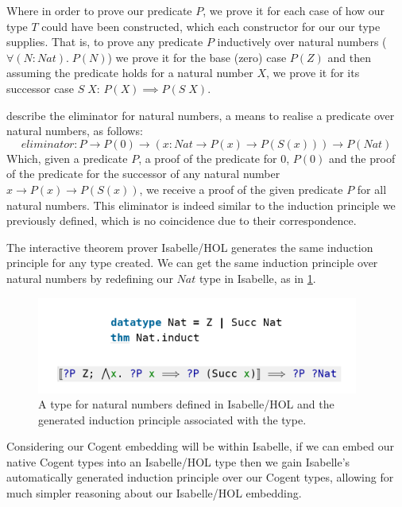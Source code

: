 Where in order to prove our predicate $P$, we prove it for each case of how our type $T$ could have been
constructed, which each constructor for our our type supplies.
That is, to prove any predicate $P$ inductively over natural numbers ($\forall(N : Nat).\; P(N)$)
we prove it for the base (zero) case $P(Z)$ and then assuming the predicate holds
for a natural number $X$, we prove it for its successor case $S\; X$: $P(X) \implies P(S\; X)$.

\citet{CoquandTypes} describe the eliminator for natural numbers, a means to realise a predicate over
natural numbers, as follows:
\[
    eliminator : P \rightarrow P (0) \rightarrow (x : Nat \rightarrow P (x) \rightarrow P(S(x))) \rightarrow P(Nat)    
\]
Which, given a predicate $P$, a proof of the predicate for $0$, $P(0)$ and the proof of the predicate
for the successor of any natural number $x  \rightarrow P (x) \rightarrow P(S(x))$, we receive a proof
of the given predicate $P$ for all natural numbers. This eliminator is indeed similar to the induction
principle we previously defined, which is no coincidence due to their correspondence.

The interactive theorem prover Isabelle/HOL generates the same induction principle for any type created.
We can get the same induction principle over natural numbers by redefining our $Nat$
type in Isabelle, as in \ref{fig:IsabelleNatInduct}.

\begin{figure}
    \centering

    \includegraphics[width=300pt]{content/isabelleNatInduct.png}
    \caption{A type for natural numbers defined in Isabelle/HOL and the generated 
    induction principle associated with the type.}
    \label{fig:IsabelleNatInduct}
\end{figure}

\FloatBarrier

Considering our Cogent embedding will be within Isabelle, if we can embed our native
Cogent types into an Isabelle/HOL type then we gain Isabelle's automatically generated
induction principle over our Cogent types, allowing for much 
simpler reasoning about our Isabelle/HOL embedding.

